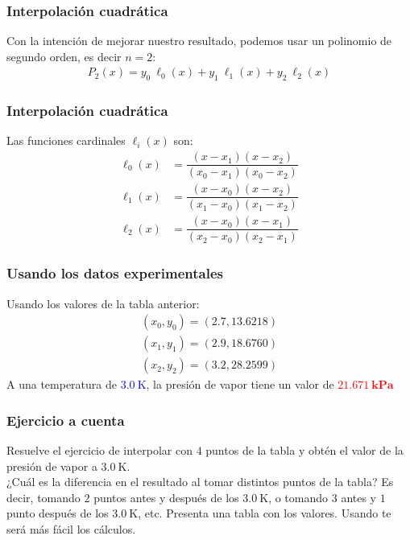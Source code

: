 \documentclass[12pt]{beamer}
\begin{document}
\begin{frame}
\frametitle{Interpolación cuadrática}
Con la intención de mejorar nuestro resultado, podemos usar un polinomio de segundo orden, es decir $n = 2$:
\pause
\begin{align*}
P_{2} (x) = y_{0} \: \ell_{0} (x) + y_{1} \: \ell_{1} (x) + y_{2} \: \ell_{2} (x)
\end{align*}
\end{frame}
\begin{frame}
\frametitle{Interpolación cuadrática}
Las funciones cardinales $\ell_{i}(x)$ son:
\pause
\begin{align*}
\ell_{0} (x) &= \dfrac{(x - x_{1})(x - x_{2})}{(x_{0} - x_{1})(x_{0} - x_{2})} \\[1em]
\ell_{1} (x) &= \dfrac{(x - x_{0})(x - x_{2})}{(x_{1} - x_{0})(x_{1} - x_{2})} \\[1em]
\ell_{2} (x) &= \dfrac{(x - x_{0})(x - x_{1})}{(x_{2} - x_{0})(x_{2} - x_{1})} 
\end{align*}
\end{frame}
\begin{frame}
\frametitle{Usando los datos experimentales}
Usando los valores de la tabla anterior:
\pause
\begin{eqnarray*}
(x_{0}, y_{0}) = (2.7, 13.6218) \\
(x_{1}, y_{1}) = (2.9, 18.6760) \\
(x_{2}, y_{2}) = (3.2, 28.2599)
\end{eqnarray*}
\pause
A una temperatura de \textcolor{blue}{$\SI{3.0}{\kelvin}$}, la presión de vapor tiene un valor de \textcolor{red}{$\mathbf{\SI{21.671}{\kilo\pascal}}$}
\\
\bigskip
{}
\end{frame}
\begin{frame}
\frametitle{Ejercicio a cuenta}
Resuelve el ejercicio de interpolar con $4$ puntos de la tabla y obtén el valor de la presión de vapor a $\SI{3.0}{\kelvin}$.
\\
\bigskip
¿Cuál es la diferencia en el resultado al tomar distintos puntos de la tabla? Es decir, tomando $2$ puntos antes y después de los $\SI{3.0}{\kelvin}$, o tomando $3$ antes y $1$ punto después de los $\SI{3.0}{\kelvin}$, etc. Presenta una tabla con los valores. Usando \python{} te será más fácil los cálculos. 
\end{frame}
\end{document}
